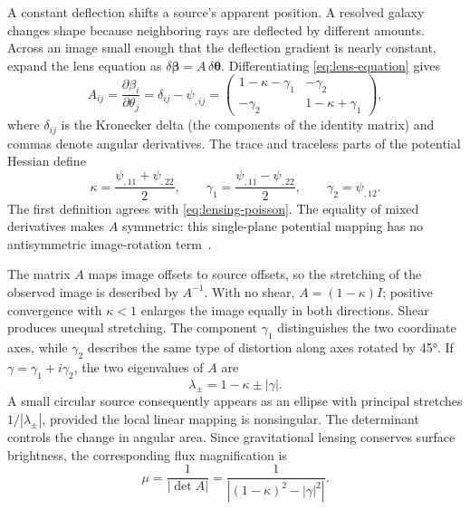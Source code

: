 A constant deflection shifts a source's apparent position. A resolved galaxy changes shape because neighboring rays are deflected by different amounts. Across an image small enough that the deflection gradient is nearly constant, expand the lens equation as $\delta\boldsymbol{\beta}=A\,\delta\boldsymbol{\theta}$. Differentiating \cref{eq:lens-equation} gives
\begin{equation}
    A_{ij}=\frac{\partial\beta_i}{\partial\theta_j}
    =\delta_{ij}-\psi_{,ij}
    =\begin{pmatrix}
        1-\kappa-\gamma_1 & -\gamma_2\\
        -\gamma_2 & 1-\kappa+\gamma_1
    \end{pmatrix},
    \label{eq:jacobian}
\end{equation}
where $\delta_{ij}$ is the Kronecker delta (the components of the identity matrix) and commas denote angular derivatives. The trace and traceless parts of the potential Hessian define
\begin{equation}
    \kappa=\frac{\psi_{,11}+\psi_{,22}}{2},
    \qquad
    \gamma_1=\frac{\psi_{,11}-\psi_{,22}}{2},
    \qquad
    \gamma_2=\psi_{,12}.
    \label{eq:potential-derivatives}
\end{equation}
The first definition agrees with \cref{eq:lensing-poisson}. The equality of mixed derivatives makes $A$ symmetric: this single-plane potential mapping has no antisymmetric image-rotation term~\cite{yoo_weak_2026,schneider_weak_2006}.

The matrix $A$ maps image offsets to source offsets, so the stretching of the observed image is described by $A^{-1}$. With no shear, $A=(1-\kappa)I$; positive convergence with $\kappa<1$ enlarges the image equally in both directions. Shear produces unequal stretching. The component $\gamma_1$ distinguishes the two coordinate axes, while $\gamma_2$ describes the same type of distortion along axes rotated by \ang{45}. If $\gamma=\gamma_1+i\gamma_2$, the two eigenvalues of $A$ are
\begin{equation}
    \lambda_{\pm}=1-\kappa\pm|\gamma|.
    \label{eq:lensing-eigenvalues}
\end{equation}
A small circular source consequently appears as an ellipse with principal stretches $1/|\lambda_{\pm}|$, provided the local linear mapping is nonsingular. The determinant controls the change in angular area. Since gravitational lensing conserves surface brightness, the corresponding flux magnification is~\cite{yoo_weak_2026,schneider_weak_2006}
\begin{equation}
    \mu=\frac{1}{|\det A|}
    =\frac{1}{\left|(1-\kappa)^2-|\gamma|^2\right|}.
    \label{eq:magnification}
\end{equation}

